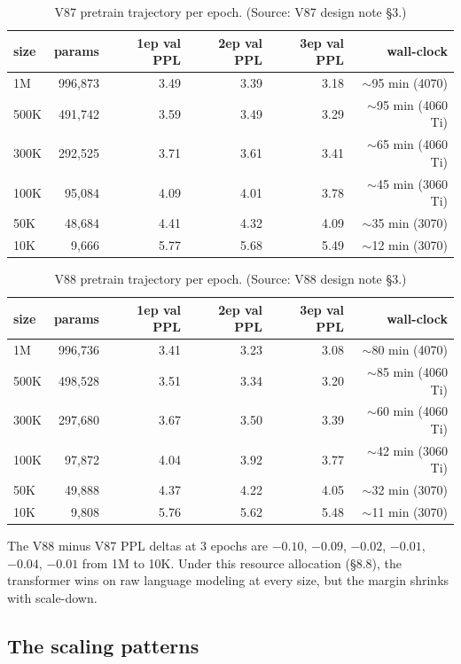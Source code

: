 \documentclass[11pt]{article}
\begin{document}
\begin{table}[!t]
\small
\caption{V87 pretrain trajectory per epoch. (Source: V87 design note \S3.)}
\label{tab:v87-pretrain}
\centering
\begin{tabular}{lrrrrr}
\toprule
size & params & 1ep val PPL & 2ep val PPL & 3ep val PPL & wall-clock \\
\midrule
1M   & 996,873 & 3.49 & 3.39 & 3.18 & $\sim$95 min (4070) \\
500K & 491,742 & 3.59 & 3.49 & 3.29 & $\sim$95 min (4060 Ti) \\
300K & 292,525 & 3.71 & 3.61 & 3.41 & $\sim$65 min (4060 Ti) \\
100K &  95,084 & 4.09 & 4.01 & 3.78 & $\sim$45 min (3060 Ti) \\
50K  &  48,684 & 4.41 & 4.32 & 4.09 & $\sim$35 min (3070) \\
10K  &   9,666 & 5.77 & 5.68 & 5.49 & $\sim$12 min (3070) \\
\bottomrule
\end{tabular}
\end{table}

\begin{table}[!t]
\small
\caption{V88 pretrain trajectory per epoch. (Source: V88 design note \S3.)}
\label{tab:v88-pretrain}
\centering
\begin{tabular}{lrrrrr}
\toprule
size & params & 1ep val PPL & 2ep val PPL & 3ep val PPL & wall-clock \\
\midrule
1M   & 996,736 & 3.41 & 3.23 & 3.08 & $\sim$80 min (4070) \\
500K & 498,528 & 3.51 & 3.34 & 3.20 & $\sim$85 min (4060 Ti) \\
300K & 297,680 & 3.67 & 3.50 & 3.39 & $\sim$60 min (4060 Ti) \\
100K &  97,872 & 4.04 & 3.92 & 3.77 & $\sim$42 min (3060 Ti) \\
50K  &  49,888 & 4.37 & 4.22 & 4.05 & $\sim$32 min (3070) \\
10K  &   9,808 & 5.76 & 5.62 & 5.48 & $\sim$11 min (3070) \\
\bottomrule
\end{tabular}
\end{table}

The V88 minus V87 PPL deltas at 3 epochs are $-0.10$, $-0.09$, $-0.02$, $-0.01$, $-0.04$, $-0.01$ from 1M to 10K. Under this resource allocation (\S8.8), the transformer wins on raw language modeling at every size, but the margin shrinks with scale-down.

\subsection{The scaling patterns}
\end{document}
